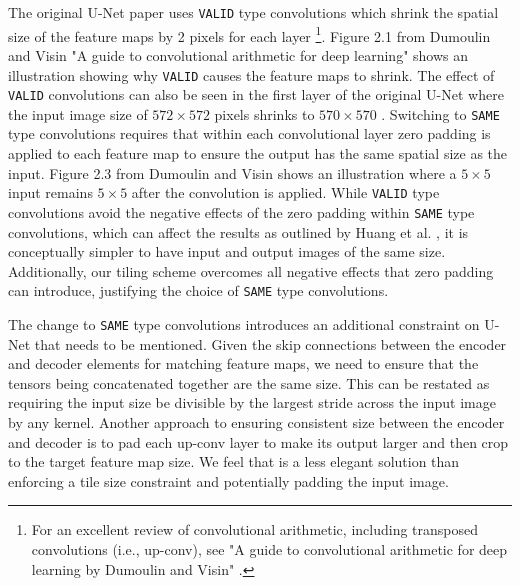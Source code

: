 \documentclass[10pt, indentfirst]{article}
\begin{document}
The original U-Net paper uses \texttt{VALID} type convolutions which shrink the spatial size of the feature maps by 2 pixels for each layer \cite{Dumoulin2018}\footnote{For an excellent review of convolutional arithmetic, including transposed convolutions (i.e., up-conv), see "A guide to convolutional arithmetic for deep learning by Dumoulin and Visin" \cite{Dumoulin2018}.}.
Figure 2.1 from Dumoulin and Visin "A guide to convolutional arithmetic for deep learning" \cite{Dumoulin2018} shows an illustration showing why \texttt{VALID} causes the feature maps to shrink.
The effect of \texttt{VALID} convolutions can also be seen in the first layer of the original U-Net where the input image size of $572 \times 572$ pixels shrinks to $570 \times 570$ \cite{Ronneberger2015a}.
Switching to \texttt{SAME} type convolutions requires that within each convolutional layer zero padding is applied to each feature map to ensure the output has the same spatial size as the input.
Figure 2.3 from Dumoulin and Visin \cite{Dumoulin2018} shows an illustration where a $ 5 \times 5$ input remains $5 \times 5$ after the convolution is applied.
While \texttt{VALID} type convolutions avoid the negative effects of the zero padding within \texttt{SAME} type convolutions, which can affect the results as outlined by Huang et al. \cite{Huang2019a}, it is conceptually simpler to have input and output images of the same size.
Additionally, our tiling scheme overcomes all negative effects that zero padding can introduce, justifying the choice of \texttt{SAME} type convolutions.

The change to \texttt{SAME} type convolutions introduces an additional constraint on U-Net that needs to be mentioned.
Given the skip connections between the encoder and decoder elements for matching feature maps, we need to ensure that the tensors being concatenated together are the same size.
This can be restated as requiring the input size be divisible by the largest stride across the input image by any kernel.
Another approach to ensuring consistent size between the encoder and decoder is to pad each up-conv layer to make its output larger and then crop to the target feature map size.
We feel that is a less elegant solution than enforcing a tile size constraint and potentially padding the input image.
\end{document}
